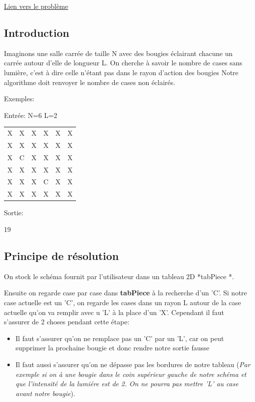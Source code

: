 \documentclass[11pt]{article}
\begin{document}
\href{https://www.codingame.com/training/easy/lumen}{Lien vers le problème} 

\subsection{Introduction}
\label{sec:org9e1215e}

Imaginons une salle carrée de taille N avec des bougies éclairant chacune un carrée autour d'elle de longueur L.
On cherche à savoir le nombre de cases sans lumière, c'est à dire celle n'étant pas dans le rayon d'action des bougies
Notre algorithme doit renvoyer le nombre de cases non éclairés.

Exemples: 

Entrée:
N=6 
L=2

\begin{center}
\begin{tabular}{llllll}
\hline
X & X & X & X & X & X\\
X & X & X & X & X & X\\
X & C & X & X & X & X\\
X & X & X & X & X & X\\
X & X & X & C & X & X\\
X & X & X & X & X & X\\
\hline
\end{tabular}
\end{center}

Sortie:

19 

\subsection{Principe de résolution}
\label{sec:org1acc82a}

On stock le schéma fournit par l'utilisateur dans un tableau 2D *tabPiece *. 

Ensuite on regarde case par case dans \textbf{tabPiece} à la recherche d'un 'C'. Si notre case actuelle est un 'C', on regarde les cases dans un rayon L autour de la case actuelle qu'on va remplir avec u 'L' à la place d'un 'X'. Cependant il faut s'assurer de 2 choses pendant cette étape:

\begin{itemize}
\item Il faut  s'assurer qu'on ne remplace pas un 'C' par un 'L', car on peut supprimer la prochaine bougie et donc rendre notre sortie fausse
\item Il faut aussi s'assurer qu'on ne dépasse pas les bordures de notre tableau (\emph{Par exemple si on à une bougie dans le coin supérieur gauche de notre schéma et que l'intensité de la lumiére est de 2. On ne pourra pas mettre 'L' au case avant notre bougie}).
\end{itemize}
\end{document}
